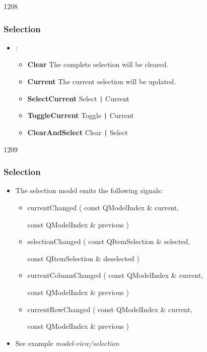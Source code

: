 \begin{slide}[fragile]{1208}
\frametitle{Selection}
\begin{itemize}
\item {}:
\begin{itemize}
\item \textbf{Clear} The complete selection will be cleared.
\item \textbf{Current} The current selection will be updated.\\

\item \textbf{SelectCurrent} Select \verb!|! Current 
\item \textbf{ToggleCurrent} Toggle \verb!|! Current
\item \textbf{ClearAndSelect} Clear \verb!|! Select
  \end{itemize}
\end{itemize}
\end{slide}

\begin{slide}{1209}\frametitle{Selection}
\begin{itemize}
\item The selection model emits the following signals:
  \begin{itemize}
  \item currentChanged ( const QModelIndex \& current,\\
    \strut\hspace{28.5mm}const QModelIndex \& previous )
  \item selectionChanged ( const QItemSelection \& selected,\\
    \strut\hspace{30.5mm}const QItemSelection \& deselected )
  \item currentColumnChanged ( const QModelIndex \& current,\\
    \strut\hspace{40.5mm}const QModelIndex \& previous )
  \item currentRowChanged ( const QModelIndex \& current,\\
    \strut\hspace{35mm}const QModelIndex \& previous )
  \end{itemize}
\item See example \emph{model-view/selection}
\end{itemize}
\end{slide}

